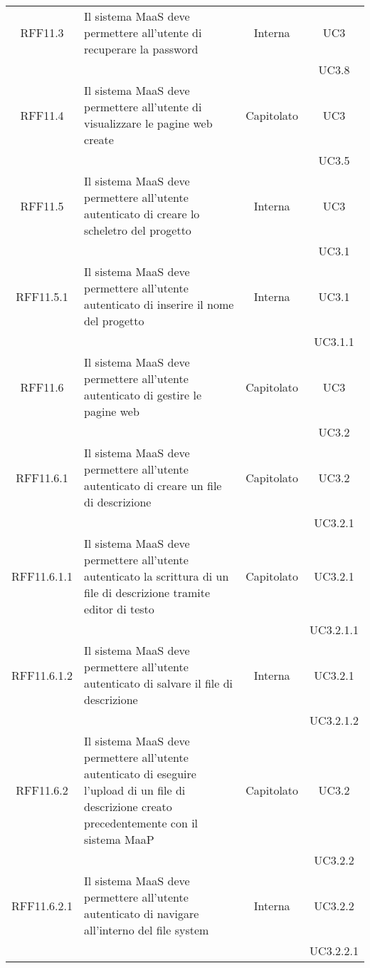 \begin{longtable}{|c|p{6cm}|c|c|}
\midrule
RFF11.3
& Il sistema MaaS deve permettere all'utente di recuperare la password
& Interna
& UC3\\
& & & UC3.8\\

\midrule
RFF11.4
& Il sistema MaaS deve permettere all'utente di visualizzare le pagine web create
& Capitolato
& UC3\\
& & & UC3.5\\

\midrule
RFF11.5
& Il sistema MaaS deve permettere all'utente autenticato di creare lo scheletro del progetto
& Interna
& UC3\\
& & & UC3.1\\

\midrule
RFF11.5.1
& Il sistema MaaS deve permettere all'utente autenticato di inserire il nome del progetto
& Interna
& UC3.1\\
& & & UC3.1.1\\

\midrule
RFF11.6
& Il sistema MaaS deve permettere all'utente autenticato di gestire le pagine web
& Capitolato
& UC3\\
& & & UC3.2\\

\midrule
RFF11.6.1
& Il sistema MaaS deve permettere all'utente autenticato di creare un file di descrizione
& Capitolato
& UC3.2\\
& & & UC3.2.1\\

\midrule
RFF11.6.1.1
& Il sistema MaaS deve permettere all'utente autenticato la scrittura di un file di descrizione tramite editor di testo
& Capitolato
& UC3.2.1\\
& & & UC3.2.1.1\\

\midrule
RFF11.6.1.2
& Il sistema MaaS deve permettere all'utente autenticato di salvare il file di descrizione
& Interna
& UC3.2.1\\
& & & UC3.2.1.2\\


\midrule
RFF11.6.2
& Il sistema MaaS deve permettere all'utente autenticato di eseguire l'upload di un file di descrizione creato precedentemente con il sistema MaaP
& Capitolato
& UC3.2\\
& & & UC3.2.2\\

\midrule
RFF11.6.2.1
& Il sistema MaaS deve permettere all'utente autenticato di navigare all'interno del file system
& Interna
& UC3.2.2\\
& & & UC3.2.2.1\\


\end{longtable}
